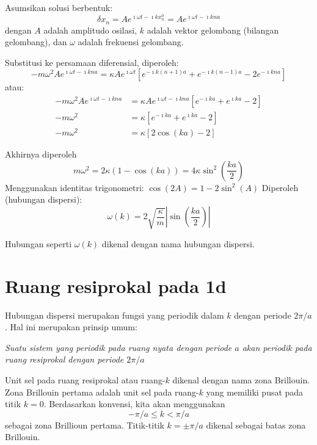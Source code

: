 Asumsikan solusi berbentuk:
\begin{equation*}
\delta x_{n} = A e^{\imath \omega t - \imath k x^{0}_{n}} = 
A e^{\imath \omega t - \imath k n a}
\end{equation*}
dengan $A$ adalah amplitudo osilasi, $k$ adalah vektor
gelombang (bilangan gelombang), dan $\omega$ adalah frekuensi
gelombang.

Substitusi ke persamaan diferensial, diperoleh:
\begin{equation*}
-m\omega^2 A e^{\imath \omega t - \imath k n a} = 
\kappa A e^{\imath \omega t} \left[ 
e^{-\imath k (n+1) a} +
e^{-\imath k (n-1) a} -
2e^{-\imath k n a}
\right]
\end{equation*}
atau:
\begin{align*}
-m\omega^2 A e^{\imath \omega t - \imath k n a} & = 
\kappa A e^{\imath \omega t - \imath k n a} \left[ 
e^{-\imath k a} + e^{\imath k a} - 2 \right] \\
-m\omega^2 & = \kappa \left[ e^{-\imath k a} + e^{\imath k a} - 2 \right] \\
-m\omega^2 & = \kappa \left[ 2\cos(ka) - 2 \right]
\end{align*}

Akhirnya diperoleh
\begin{equation*}
m\omega^2 = 2\kappa\left( 1 - \cos(ka) \right) = 4\kappa \sin^2 \left( \frac{ka}{2} \right)
\end{equation*}
Menggunakan identitas trigonometri: $\cos(2A) = 1 - 2\sin^2(A)$
Diperoleh (hubungan dispersi):
\begin{equation}
\omega(k) = 2\sqrt{\frac{\kappa}{m}} \left| \sin\left(\frac{ka}{2}\right) \right|
\end{equation}

Hubungan seperti $\omega(k)$ dikenal dengan nama hubungan dispersi.

\section{Ruang resiprokal pada 1d}

Hubungan dispersi merupakan fungsi yang periodik dalam $k$ dengan
periode $2\pi/a$. Hal ini merupakan prinsip umum:

\emph{Suatu sistem
yang periodik pada ruang nyata dengan periode $a$ akan periodik pada
ruang resiprokal dengan periode $2\pi/a$}

Unit sel pada ruang resiprokal atau ruang-$k$ dikenal dengan nama zona
Brillouin. Zona Brillouin pertama adalah unit sel pada ruang-$k$ yang
memiliki pusat pada titik $k=0$. Berdasarkan konvensi, kita akan
menggunakan
\begin{equation}
-\pi/a \leq k < \pi/a
\end{equation}
sebagai zona Brillioun pertama.
Titik-titik $k=\pm \pi/a$ dikenal sebagai batas zona Brillouin.

